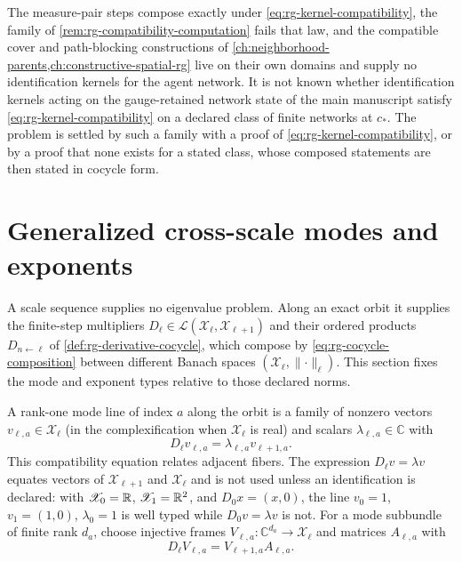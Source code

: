The measure-pair steps compose exactly under
\eqref{eq:rg-kernel-compatibility}, the family of
\cref{rem:rg-compatibility-computation} fails that law, and the compatible
cover and path-blocking constructions of
\cref{ch:neighborhood-parents,ch:constructive-spatial-rg} live on their own
domains and supply no identification kernels for the agent network. It is not
known whether identification kernels acting on the gauge-retained network
state of the main manuscript satisfy \eqref{eq:rg-kernel-compatibility} on a
declared class of finite networks at \(c_*\). The problem is settled by such a
family with a proof of \eqref{eq:rg-kernel-compatibility}, or by a proof that
none exists for a stated class, whose composed statements are then stated in
cocycle form.

\section{Generalized cross-scale modes and exponents}
\label{sec:rg-generalized-modes}

A scale sequence supplies no eigenvalue problem. Along an exact orbit it
supplies the finite-step multipliers
\(D_\ell\in\mathcal L(\mathscr X_\ell,\mathscr X_{\ell+1})\) and their ordered products
\(D_{n\leftarrow\ell}\) of \cref{def:rg-derivative-cocycle}, which compose by
\eqref{eq:rg-cocycle-composition} between different Banach spaces
\((\mathscr X_\ell,\lVert\cdot\rVert_\ell)\). This section fixes the mode and exponent
types relative to those declared norms.

A rank-one mode line of index \(a\) along the orbit is a family of nonzero
vectors \(v_{\ell,a}\in \mathscr X_\ell\) (in the complexification when \(\mathscr X_\ell\) is
real) and scalars \(\lambda_{\ell,a}\in\mathbb C\) with
\begin{equation}
D_\ell v_{\ell,a}=\lambda_{\ell,a}v_{\ell+1,a}.
\label{eq:rg-mode-line}
\end{equation}
This compatibility equation relates adjacent fibers. The expression
\(D_\ell v=\lambda v\) equates vectors of \(\mathscr X_{\ell+1}\) and \(\mathscr X_\ell\) and is
not used unless an identification is declared: with \(\mathscr X_0=\mathbb R\), \(\mathscr X_1=\mathbb R^2\),
and \(D_0x=(x,0)\), the line \(v_0=1\), \(v_1=(1,0)\), \(\lambda_0=1\) is well
typed while \(D_0v=\lambda v\) is not. For a mode subbundle of finite rank
\(d_a\), choose injective frames \(V_{\ell,a}:\mathbb C^{d_a}\to \mathscr X_\ell\) and
matrices \(A_{\ell,a}\) with
\begin{equation}
D_\ell V_{\ell,a}=V_{\ell+1,a}A_{\ell,a}.
\label{eq:rg-mode-frame}
\end{equation}

